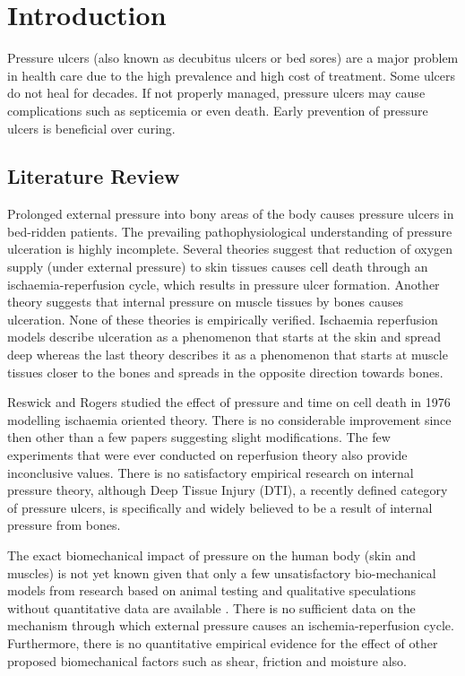 \chapter{Introduction}
\label{chapter:introduction}

Pressure ulcers (also known as decubitus ulcers or bed sores) are a major problem in health care due to the high prevalence and high cost of treatment. Some ulcers do not heal for decades. If not properly managed, pressure ulcers may cause complications such as septicemia or even death. Early prevention of pressure ulcers is beneficial over curing. \cite{npuapguide}


\section{Literature Review}
Prolonged external pressure into bony areas of the body causes pressure ulcers in bed-ridden patients. The prevailing pathophysiological understanding of pressure ulceration is highly incomplete. Several theories suggest that reduction of oxygen supply (under external pressure) to skin tissues causes cell death through an ischaemia-reperfusion cycle, which results in pressure ulcer formation. Another theory suggests that internal pressure on muscle tissues by bones causes ulceration. \cite{putheories} None of these theories is empirically verified. Ischaemia reperfusion models describe ulceration as a phenomenon that starts at the skin and spread deep whereas the last theory describes it as a phenomenon that starts at muscle tissues closer to the bones and spreads in the opposite direction towards bones. 

Reswick and Rogers studied the effect of pressure and time on cell death in 1976 modelling ischaemia oriented theory.\cite{inverserel} There is no considerable improvement since then other than a few papers suggesting slight modifications. The few experiments that were ever conducted on reperfusion theory also provide inconclusive values. There is no satisfactory empirical research on internal pressure theory, although Deep Tissue Injury (DTI), a recently defined category of pressure ulcers, is specifically and widely believed to be a result of internal pressure from bones. \cite{deephypo}


The exact biomechanical impact of pressure on the human body (skin and muscles) is not yet known given that only a few unsatisfactory bio-mechanical models from research based on animal testing \cite{animalmodels}  and qualitative speculations without quantitative data are available \cite{bloodflow,celldeaththresh,cyclicpressure}. There is no sufficient data on the mechanism through which external pressure causes an ischemia-reperfusion cycle. Furthermore, there is no quantitative empirical evidence for the effect of other proposed biomechanical factors such as shear, friction and moisture also. 

